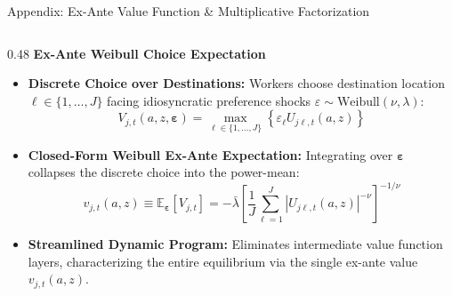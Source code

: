 \documentclass[aspectratio=169, 10pt]{beamer}
\begin{document}
\begin{frame}{Appendix: Ex-Ante Value Function \& Multiplicative Factorization \hfill \hyperlink{main:prop1}{\scriptsize{}}}\label{backup:exante_bellman}
    \begin{columns}[T]
        \begin{column}{0.48\textwidth}
            \textbf{\small Ex-Ante Weibull Choice Expectation}
            \vspace{0.04cm}
            \begin{itemize}\scriptsize\setlength{\itemsep}{2pt}
                \item \textbf{Discrete Choice over Destinations:}
                Workers choose destination location $\ell \in \{1,\dots,J\}$ facing idiosyncratic preference shocks $\varepsilon \sim \text{Weibull}(\nu, \lambda)$:
                $$V_{j,t}(a, z, \boldsymbol{\varepsilon}) = \max_{\ell \in \{1,\dots,J\}} \left\{ \varepsilon_\ell U_{j\ell,t}(a, z) \right\}$$
                \item \textbf{Closed-Form Weibull Ex-Ante Expectation:}
                Integrating over $\boldsymbol{\varepsilon}$ collapses the discrete choice into the power-mean:
                $$v_{j,t}(a, z) \equiv \mathbb{E}_{\boldsymbol{\varepsilon}} [V_{j,t}] = -\bar{\lambda} \left[ \frac{1}{J} \sum_{\ell=1}^J |U_{j\ell,t}(a, z)|^{-\nu} \right]^{-1/\nu}$$
                \item \textbf{Streamlined Dynamic Program:}
                Eliminates intermediate value function layers, characterizing the entire equilibrium via the single ex-ante value $v_{j,t}(a, z)$.
            \end{itemize}
        \end{column}
        

\end{columns}
\end{frame}
\end{document}
